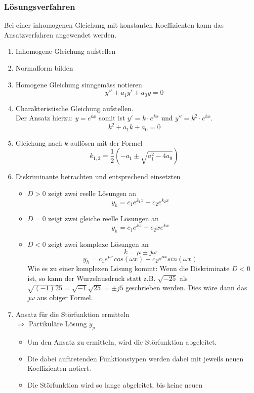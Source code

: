 \subsubsection{Lösungsverfahren}
Bei einer inhomogenen Gleichung mit konstanten Koeffizienten kann das 
Ansatzverfahren angewendet werden. 
\begin{enumerate}
  \item Inhomogene Gleichung aufstellen
  \item Normalform bilden
  \item Homogene Gleichung sinngemäss notieren
	\[ y'' + a_1y' + a_0y = 0 \]
  \item Charakteristische Gleichung aufstellen.\\
	Der Ansatz hierzu: $y=e^{kx}$ somit ist $y'=k\cdot e^{kx}$
	und $y''=k^2 \cdot e^{kx}$.
	\[ k^2 + a_1k + a_0 = 0 \]
  \item Gleichung nach $k$ auflösen mit der Formel
	\[ k_{1,2} = \frac{1}{2}\left( -a_1 \pm \sqrt{a_1^2 - 4a_0} \right)  \]
  \item Diskriminante betrachten und entsprechend einsetzten
	\begin{itemize}
	  \item $D > 0$ zeigt zwei reelle Lösungen an\\
		\[ y_h=c_1e^{k_1x} + c_2e^{k_2x} \]
          \item $D = 0$ zeigt zwei gleiche reelle Lösungen an\\
		\[ y_h=c_1e^{kx} + c_2xe^{kx} \]
          \item $D < 0$ zeigt zwei komplexe Lösungen an\\
		\[ k=\mu \pm j \omega \]
		\[ y_h=c_1e^{\mu x} cos(\omega x) + c_2e^{\mu x} sin(\omega x) \]
		Wie es zu einer komplexen Lösung kommt: 
		Wenn die Diskriminate $D < 0$ ist, so kann der Wurzelausdruck
		statt z.B. $\sqrt{-25}$ als 
		$\sqrt{(-1)25}=\sqrt{-1}\sqrt{25}=\pm j5$ geschrieben werden.
		Dies wäre dann das $j\omega$ aus obiger Formel.
	\end{itemize}
  \item Ansatz für die Störfunktion ermitteln \\
    $\Rightarrow$ Partikuläre Lösung $y_p$ 
    \begin{itemize}
      \item Um den Ansatz zu ermitteln, wird die Störfunktion 
            abgeleitet. 
      \item Die dabei auftretenden Funktionstypen werden dabei mit 
            jeweils neuen Koeffizienten notiert. 
      \item Die Störfunktion wird so lange abgeleitet, bis keine neuen 

\end{itemize}
\end{enumerate}
